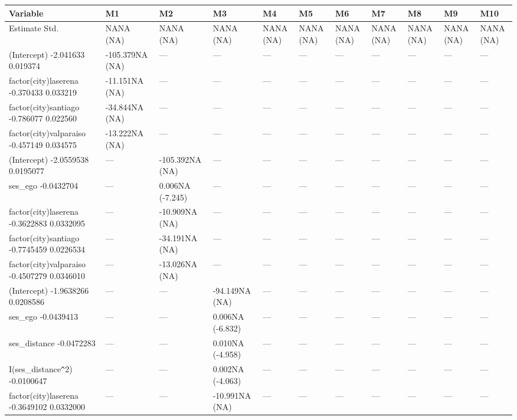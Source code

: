 \begin{table}[ht]
\centering
\begin{tabular}{lllllllllll}
  \hline
Variable & M1 & M2 & M3 & M4 & M5 & M6 & M7 & M8 & M9 & M10 \\ 
  \hline
Estimate Std. & NANA (NA) & NANA (NA) & NANA (NA) & NANA (NA) & NANA (NA) & NANA (NA) & NANA (NA) & NANA (NA) & NANA (NA) & NANA (NA) \\ 
  (Intercept) -2.041633 0.019374 & -105.379NA (NA) & --- & --- & --- & --- & --- & --- & --- & --- & --- \\ 
  factor(city)laserena -0.370433 0.033219 & -11.151NA (NA) & --- & --- & --- & --- & --- & --- & --- & --- & --- \\ 
  factor(city)santiago -0.786077 0.022560 & -34.844NA (NA) & --- & --- & --- & --- & --- & --- & --- & --- & --- \\ 
  factor(city)valparaiso -0.457149 0.034575 & -13.222NA (NA) & --- & --- & --- & --- & --- & --- & --- & --- & --- \\ 
  (Intercept) -2.0559538 0.0195077 & --- & -105.392NA (NA) & --- & --- & --- & --- & --- & --- & --- & --- \\ 
  ses\_ego -0.0432704 & --- & 0.006NA (-7.245) & --- & --- & --- & --- & --- & --- & --- & --- \\ 
  factor(city)laserena -0.3622883 0.0332095 & --- & -10.909NA (NA) & --- & --- & --- & --- & --- & --- & --- & --- \\ 
  factor(city)santiago -0.7745459 0.0226534 & --- & -34.191NA (NA) & --- & --- & --- & --- & --- & --- & --- & --- \\ 
  factor(city)valparaiso -0.4507279 0.0346010 & --- & -13.026NA (NA) & --- & --- & --- & --- & --- & --- & --- & --- \\ 
  (Intercept) -1.9638266 0.0208586 & --- & --- & -94.149NA (NA) & --- & --- & --- & --- & --- & --- & --- \\ 
  ses\_ego -0.0439413 & --- & --- & 0.006NA (-6.832) & --- & --- & --- & --- & --- & --- & --- \\ 
  ses\_distance -0.0472283 & --- & --- & 0.010NA (-4.958) & --- & --- & --- & --- & --- & --- & --- \\ 
  I(ses\_distance\verb|^|2) -0.0100647 & --- & --- & 0.002NA (-4.063) & --- & --- & --- & --- & --- & --- & --- \\ 
  factor(city)laserena -0.3649102 0.0332000 & --- & --- & -10.991NA (NA) & --- & --- & --- & --- & --- & --- & --- \\ 

\end{tabular}
\end{table}
